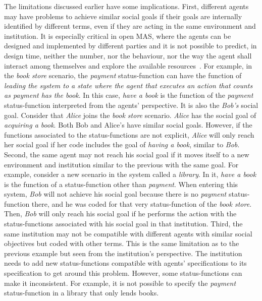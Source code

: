 \documentclass[runningheads]{llncs}
\begin{document}
The limitations discussed earlier have some implications. First, different agents may have problems to achieve similar social goals if their goals are internally identified by different terms, even if they are acting in the same environment and institution. It is especially critical in open MAS, where the agents can be designed and implemented by different parties and it is not possible to predict, in design time, neither the number, nor the behaviour, nor the way the agent shall interact among themselves and explore the available resources~\cite{fornara2004agent,Piunti2009}.
For example, in the \emph{book store} scenario, the \emph{payment} status-function can have the function of \textit{leading the system to a state where the agent that executes an action that counts as payment has the book}. In this case, \emph{have a book} is the function of the \emph{payment} status-function interpreted from the agents' perspective. It is also the \emph{Bob's} social goal. Consider that \emph{Alice} joins the \emph{book store} scenario. \emph{Alice} has the social goal of \emph{acquiring a book}. Both Bob and Alice's have similar social goals. However, if the functions associated to the status-functions are not explicit, \emph{Alice} will only reach her social goal if her code includes the goal of \emph{having a book}, similar to \emph{Bob}.
Second, the same agent may not reach his social goal if it moves itself to a new environment and institution similar to the previous with the same goal.
For example, consider a new scenario in the system called a \emph{library}. In it, \emph{have a book}
is the function of a status-function other than \emph{payment}. When entering this system, \emph{Bob} will not achieve his social goal because there is no \emph{payment} status-function there, and he was coded for that very status-function of the \emph{book store}. 
Then, \emph{Bob} will only reach his social goal if he performs the action with the status-functions associated with his social goal in that institution.
Third, the same institution may not be compatible with different agents with similar social objectives but coded with other terms. This is the same limitation as to the previous example but seen from the institution's perspective. The institution needs to add new status-functions compatible with agents' specifications to its specification to get around this problem. However, some status-functions can make it inconsistent.
For example, it is not possible to specify the \emph{payment} status-function in a library that only lends books.
\end{document}
